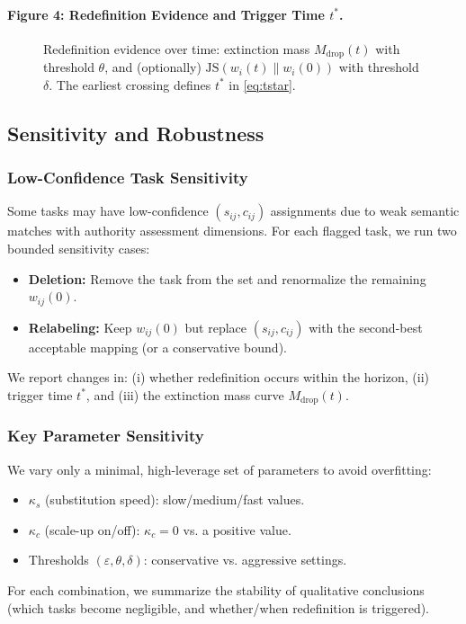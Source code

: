 \paragraph{Figure 4: Redefinition Evidence and Trigger Time $t^*$.}
\begin{figure}[ht]
\centering
\caption{Redefinition evidence over time: extinction mass $M_{\text{drop}}(t)$ with threshold $\theta$, and (optionally) $\mathrm{JS}(w_i(t)\|w_i(0))$ with threshold $\delta$. The earliest crossing defines $t^*$ in \eqref{eq:tstar}.}
\label{fig:redefinition_trigger}
\end{figure}

\subsection{Sensitivity and Robustness}
\label{sec:sensitivity}

\subsubsection{Low-Confidence Task Sensitivity}
\label{sec:low_conf_task}
Some tasks may have low-confidence $(s_{ij},c_{ij})$ assignments due to weak semantic matches with authority assessment dimensions. For each flagged task, we run two bounded sensitivity cases:
\begin{itemize}
  \item \textbf{Deletion:} Remove the task from the set and renormalize the remaining $w_{ij}(0)$.
  \item \textbf{Relabeling:} Keep $w_{ij}(0)$ but replace $(s_{ij},c_{ij})$ with the second-best acceptable mapping (or a conservative bound).
\end{itemize}
We report changes in: (i) whether redefinition occurs within the horizon, (ii) trigger time $t^*$, and (iii) the extinction mass curve $M_{\text{drop}}(t)$.

\subsubsection{Key Parameter Sensitivity}
\label{sec:param_sens}
We vary only a minimal, high-leverage set of parameters to avoid overfitting:
\begin{itemize}
  \item $\kappa_s$ (substitution speed): slow/medium/fast values.
  \item $\kappa_c$ (scale-up on/off): $\kappa_c=0$ vs. a positive value.
  \item Thresholds $(\varepsilon,\theta,\delta)$: conservative vs. aggressive settings.
\end{itemize}
For each combination, we summarize the stability of qualitative conclusions (which tasks become negligible, and whether/when redefinition is triggered).

